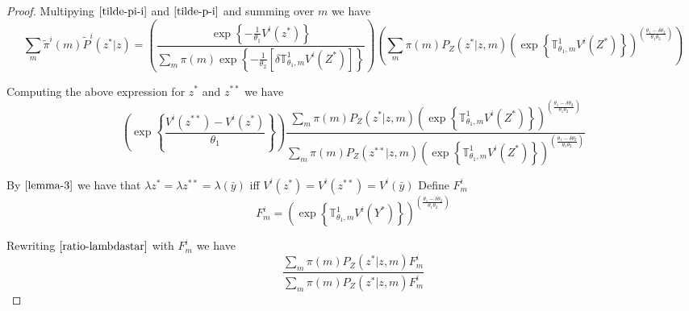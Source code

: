 \documentclass[12pt]{article}
\newtheorem*{proof}{Proof}
\begin{document}
\begin{proof}
Multipying $\ref{tilde-pi-i}$ and $\ref{tilde-p-i}$ and summing over $m$ we have 
\scriptsize{
\[\sum_{m}\tilde \pi^i(m)\tilde P^i(z^*|z)=\left(\frac{\exp\left\{-\frac{1}{\theta_1} V^i(z^*)\right\}}{\sum_{m}{\pi(m) \exp\left\{-\frac{1}{\theta_2}\left[\delta\mathbb{T}^1_{\theta_1,m}V^i(Z^*)\right]\right\}}}\right)\left(\sum_{m}\pi(m)P_Z(z^*|z,m)\left(\exp\left \{\mathbb{T}^1_{\theta_1,m}V^i(Z^*)\right\}\right)^{\left(\frac{\theta_1-\delta\theta_2}{\theta_1\theta_2}\right)}\right)\]
}

Computing the above expression for $z^*$ and $z^{**}$ we have
\begin{equation}
\label{ratio-lambdastar}
\left(\exp\left\{\frac{V^i(z^{**})-V^i(z^*)}{\theta_1}\right\}\right)
\frac{\sum_{m}\pi(m)P_Z(z^*|z,m)
\left(\exp\left \{
\mathbb{T}^1_{\theta_1,m}V^i(Z^*)
\right\}
\right)^{\left(\frac{\theta_1-\delta\theta_2}{\theta_1\theta_2}\right)}
}
{\sum_{m}\pi(m)P_Z(z^{**}|z,m)
\left(
\exp\left \{
\mathbb{T}^1_{\theta_1,m}V^i(Z^*)
\right\}
\right)^{\left(\frac{\theta_1-\delta\theta_2}{\theta_1\theta_2}\right)
}
}
\end{equation}

By $\ref{lemma-3}$ we have that $\lambda{z^*}=\lambda{z^{**}}=\lambda(\bar{y})$ iff $V^i(z^*)=V^i(z^{**})=V^i(\bar{y})$
Define $F_{m}^i$
\[F_{m}^i=\left(\exp\left \{
\mathbb{T}^1_{\theta_1,m}V^i(Y^*)
\right\}
\right)^{\left(\frac{\theta_1-\delta\theta_2}{\theta_1\theta_2}\right)}
\]

Rewriting $\ref{ratio-lambdastar}$ with $F^i_{m}$ we have
\begin{equation}
\label{ratio-lambdastar-2}
\frac{\sum_{m}\pi(m)P_Z(z^*|z,m)F^i_m
}
{\sum_{m}\pi(m)P_Z(z^*|z,m)F^i_m
}
\end{equation}


\end{proof}
\end{document}
